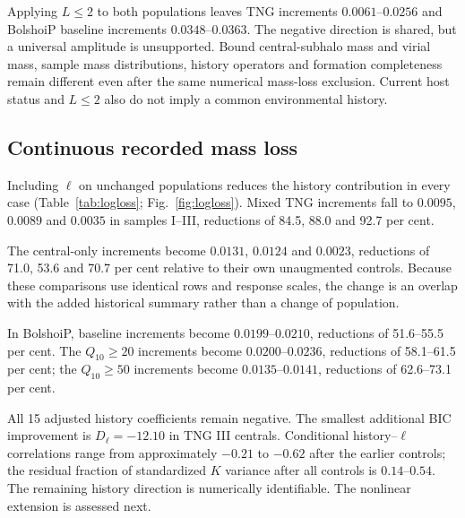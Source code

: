 \documentclass[11pt,a4paper]{article}
\begin{document}
Applying $L\leq2$ to both populations leaves TNG increments $0.0061$--$0.0256$ and BolshoiP baseline increments $0.0348$--$0.0363$. The negative direction is shared, but a universal amplitude is unsupported. Bound central-subhalo mass and virial mass, sample mass distributions, history operators and formation completeness remain different even after the same numerical mass-loss exclusion. Current host status and $L\leq2$ also do not imply a common environmental history.


\subsection{Continuous recorded mass loss}\label{sec:continuous_loss}
Including $\ell$ on unchanged populations reduces the history contribution in every case (Table~\ref{tab:logloss}; Fig.~\ref{fig:logloss}). Mixed TNG increments fall to $0.0095$, $0.0089$ and $0.0035$ in samples I--III, reductions of 84.5, 88.0 and 92.7 per cent. 

The central-only increments become $0.0131$, $0.0124$ and $0.0023$, reductions of 71.0, 53.6 and 70.7 per cent relative to their own unaugmented controls. Because these comparisons use identical rows and response scales, the change is an overlap with the added historical summary rather than a change of population. 

\begin{table}[htbp]\centering\scriptsize
\setlength{\tabcolsep}{4pt}

\caption{Continuous recorded-loss control at fiducial $\gamma_{\rm f}$. $A_\ell$ and its conventional SE refer to the history coefficient after adding $\ell$, not to the coefficient of $\ell$. $\Delta R^2_4$ is the same-row four-epoch history increment and $\Delta R^2_{4,\ell}$ is the increment beyond four epochs and $\ell$. $D_\ell$ compares those latter nested models. These fiducial-parameter fits receive their own linear-design comparisons in Table~\ref{tab:loss_designs}. Native coefficients, the $\ell$ coefficient and covariance diagnostics are supplied at full precision.}\label{tab:logloss}
\end{table}

In BolshoiP, baseline increments become $0.0199$--$0.0210$, reductions of 51.6--55.5 per cent. The $Q_{10}\geq20$ increments become $0.0200$--$0.0236$, reductions of 58.1--61.5 per cent; the $Q_{10}\geq50$ increments become $0.0135$--$0.0141$, reductions of 62.6--73.1 per cent. 

All 15 adjusted history coefficients remain negative. The smallest additional BIC improvement is $D_\ell=-12.10$ in TNG III centrals. Conditional history--$\ell$ correlations range from approximately $-0.21$ to $-0.62$ after the earlier controls; the residual fraction of standardized $K$ variance after all controls is $0.14$--$0.54$. The remaining history direction is numerically identifiable. The nonlinear extension is assessed next.
\end{document}
